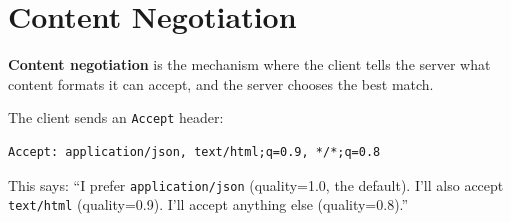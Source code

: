\begin{codebox}[short]

\begin{Shaded}
\begin{Highlighting}[]

\NormalTok{(}\OperatorTok{=}\NormalTok{[}\NormalTok{])}
\NormalTok{):}
\OperatorTok{=}
\OperatorTok{=}
     \NormalTok{:}
\end{Highlighting}
\end{Shaded}

\end{codebox}

\setcounter{section}{5}
\section{Content Negotiation}\label{34-response-handling:346-content-negotiation}

\textbf{Content negotiation} is the mechanism where the client tells the server what content formats it can accept, and the server chooses the best match.

The client sends an \texttt{Accept} header:

\begin{outputbox}[short]
\begin{Verbatim}[fontsize=\codesize, breaklines, breakanywhere, breaksymbolleft={\tiny\textcolor{muted}{$\hookrightarrow$}}]
Accept: application/json, text/html;q=0.9, */*;q=0.8
\end{Verbatim}
\end{outputbox}

\noindent{}This says: ``I prefer \texttt{application/json} (quality=1.0, the default). I'll also accept \texttt{text/html} (quality=0.9). I'll accept anything else (quality=0.8).''

